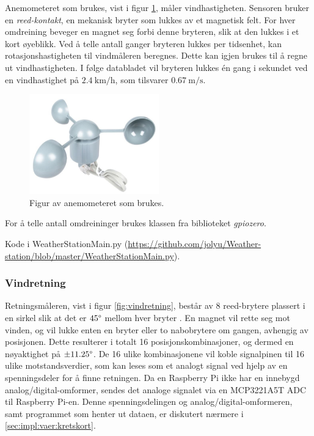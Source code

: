Anemometeret som brukes, vist i figur \ref{fig:anemometer}, måler vindhastigheten. 
Sensoren bruker en \textit{reed-kontakt}, en mekanisk bryter som lukkes av et magnetisk felt. 
For hver omdreining beveger en magnet seg forbi denne bryteren, slik at den lukkes i et kort øyeblikk. 
Ved å telle antall ganger bryteren lukkes per tidsenhet, kan rotasjonshastigheten til vindmåleren beregnes. 
Dette kan igjen brukes til å regne ut vindhastigheten. 
I følge databladet\cite{weather} vil bryteren lukkes én gang i sekundet ved en vindhastighet på $\SI{2.4}{\kilo\meter\per\hour}$, som tilsvarer $\SI{0.67}{\meter\per\second}$.


\begin{figure}[H]
    \centering
    \includegraphics[width=0.5\textwidth]{implementering/anemometer.png}
    \caption{Figur av anemometeret som brukes.}
    \label{fig:anemometer}
\end{figure}

For å telle antall omdreininger brukes klassen  fra biblioteket \textit{gpiozero}. 

Kode i WeatherStationMain.py (\url{https://github.com/jolyu/Weather-station/blob/master/WeatherStationMain.py}).  


\subsubsection{Vindretning}\label{sec:impl:vaer:vindret}

Retningsmåleren, vist i figur \ref{fig:vindretning}, består av 8 reed-brytere plassert i en sirkel slik at det er $45\degree$ mellom hver bryter \cite{weather}. 
En magnet vil rette seg mot vinden, og vil lukke enten en bryter eller to nabobrytere om gangen, avhengig av posisjonen. 
Dette resulterer i totalt 16 posisjonskombinasjoner, og dermed en nøyaktighet på $\pm 11.25\degree$. 
De 16 ulike kombinasjonene vil koble signalpinen til 16 ulike motstandsverdier, 
som kan leses som et analogt signal ved hjelp av en spenningsdeler for å finne retningen. 
Da en Raspberry Pi ikke har en innebygd analog/digital-omformer, sendes det analoge signalet via en MCP3221A5T ADC til Raspberry Pi-en. 
Denne spenningsdelingen og analog/digital-omformeren, samt programmet som henter ut dataen, er diskutert nærmere i \autoref{sec:impl:vaer:kretskort}.


